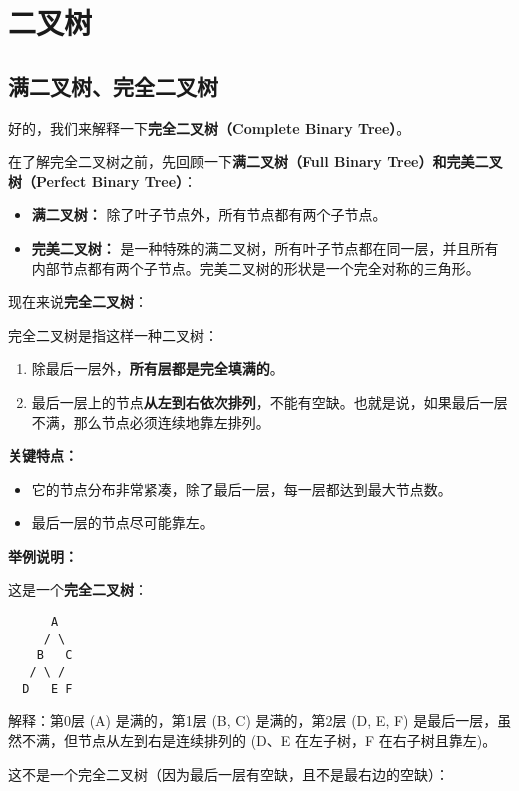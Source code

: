 \section{二叉树}

\subsection{满二叉树、完全二叉树}

好的，我们来解释一下\textbf{完全二叉树（Complete Binary Tree）}。

在了解完全二叉树之前，先回顾一下\textbf{满二叉树（Full Binary Tree）\textbf{和}完美二叉树（Perfect Binary Tree）}：

\begin{itemize}
	\item \textbf{满二叉树：} 除了叶子节点外，所有节点都有两个子节点。
	\item \textbf{完美二叉树：} 是一种特殊的满二叉树，所有叶子节点都在同一层，并且所有内部节点都有两个子节点。完美二叉树的形状是一个完全对称的三角形。
\end{itemize}

现在来说\textbf{完全二叉树}：

完全二叉树是指这样一种二叉树：

\begin{enumerate}
	\item 除最后一层外，\textbf{所有层都是完全填满的}。
	\item 最后一层上的节点\textbf{从左到右依次排列}，不能有空缺。也就是说，如果最后一层不满，那么节点必须连续地靠左排列。
\end{enumerate}

\textbf{关键特点：}

\begin{itemize}
	\item 它的节点分布非常紧凑，除了最后一层，每一层都达到最大节点数。
	\item 最后一层的节点尽可能靠左。
\end{itemize}

\textbf{举例说明：}

这是一个\textbf{完全二叉树}：

\begin{lstlisting}
      A
     / \
    B   C
   / \ /
  D   E F
\end{lstlisting}
解释：第0层 (A) 是满的，第1层 (B, C) 是满的，第2层 (D, E, F) 是最后一层，虽然不满，但节点从左到右是连续排列的 (D、E 在左子树，F 在右子树且靠左)。

这不是一个完全二叉树（因为最后一层有空缺，且不是最右边的空缺）：

